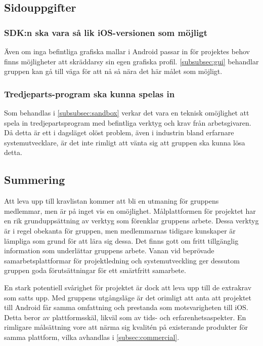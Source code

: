 \subsection{Sidouppgifter}
\subsubsection{SDK:n ska vara så lik iOS-versionen som möjligt}
Även om inga befintliga grafiska mallar i Android passar in för projektes behov finns möjligheter att skräddarsy sin egen grafiska profil. \ref{subsubsec:gui} behandlar gruppen kan gå till väga för att nå så nära det här målet som möjligt.

\subsubsection{Tredjeparts-program ska kunna spelas in}
Som behandlas i \ref{subsubsec:sandbox} verkar det vara en teknisk omöjlighet att spela in tredjepartsprogram med befintliga verktyg och krav från arbetsgivaren. Då detta är ett i dagsläget olöst problem, även i industrin bland erfarnare systemutvecklare, är det inte rimligt att vänta sig att gruppen ska kunna lösa detta.

\subsection{Summering}
Att leva upp till kravlistan kommer att bli en utmaning för gruppens medlemmar, men är på inget vis en omöjlighet. Målplattformen för projektet har en rik grunduppsättning av verktyg som förenklar gruppens arbete. Dessa verktyg är i regel obekanta för gruppen, men medlemmarnas tidigare kunskaper är lämpliga som grund för att lära sig dessa. Det finns gott om fritt tillgänglig information som underlättar gruppens arbete. Vanan vid beprövade samarbetsplattformar för projektledning och systemutveckling ger dessutom gruppen goda förutsättningar för ett smärtfritt samarbete.

En stark potentiell svårighet för projektet är dock att leva upp till de extrakrav som satts upp. Med gruppens utgångsläge är det orimligt att anta att projektet till Android får samma omfattning och prestanda som motsvarigheten till iOS. Detta beror av plattformsskäl, likväl som av tids- och erfarenhetsaspekter. En rimligare målsättning vore att närma sig kvalitén på existerande produkter för samma plattform, vilka avhandlas i \ref{subsec:commercial}.
